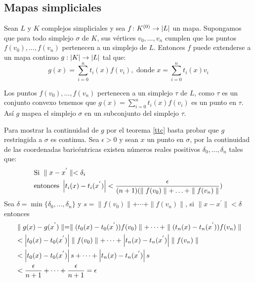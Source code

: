 \subsection{Mapas simpliciales}
\begin{Teo} \label{tms}
Sean $L$ y $K$ complejos simpliciales y sea $f\colon K^{(0)} \rightarrow \left| L \right|$ un mapa. Supongamos que  para todo simplejo $\sigma$ de $K$, sus vértices $v_0,\ldots,v_n$ cumplen que los puntos $f(v_0),\ldots,f(v_n)$ pertenecen a un simplejo de $L$.
Entonces $f$ puede extenderse a un mapa continuo $g:\left| K \right|  \rightarrow \left| L \right|$ tal que:
\begin{equation*}
g(x)= \sum_{i=0}^{n}t_i(x)f(v_i), \textrm{ donde }  x= \sum_{i=0}^{n}t_i(x)v_i
\end{equation*}
\end{Teo}
\begin{Dem}

Los puntos $f(v_0),\ldots,f(v_n)$ pertenecen a un simplejo $\tau$ de $L$, como $\tau$ es un conjunto convexo tenemos que $g(x)= \sum_{i=0}^{n}t_i(x)f(v_i)$ es un punto en $\tau$. Así $g$ mapea el simplejo $\sigma$ en un subconjunto del simplejo $\tau$.

Para mostrar la continuidad de $g$ por el teorema \ref{ttc} basta probar que $g$ restringida a $\sigma$ es continua. Sea $\epsilon > 0$ y sean $x$ un punto en $\sigma$, por la continuidad de las coordenadas baricéntricas existen números reales positivos $\delta_{0},\ldots,\delta_{n}$ tales que:
\begin{align*}
&\text{Si }\parallel x-x^{'} \parallel < \delta_{i}\\
&\text{entonces } \left| t_i(x)-t_i(x^{'}) \right|< \frac{\epsilon}{(n+1)(\parallel f(v_0)\parallel + \ldots+\parallel f(v_n)\parallel})
\end{align*}
Sea $\delta = \min\{\delta_0,\ldots,\delta_n\}$ y $s = \parallel f(v_0)\parallel + \cdots+\parallel f(v_n)\parallel$, si $\parallel x-x^{'}\parallel< \delta$ entonces
\begin{align*}
&\parallel g(x)-g(x^{'})\parallel = \parallel(t_0(x)-t_0(x^{'}))f(v_0)\parallel+\cdots+\parallel(t_n(x)-t_n(x^{'}))f(v_n)\parallel\\
&< \left| t_0(x)-t_0(x^{'}) \right|\parallel f(v_0)\parallel+\cdots +  \left| t_n(x)-t_n(x^{'}) \right|\parallel f(v_n)\parallel \\
&< \left| t_0(x)-t_0(x^{'}) \right|s+\cdots +  \left| t_n(x)-t_n(x^{'}) \right|s\\
&< \frac{\epsilon}{n+1}+\cdots + \frac{\epsilon}{n+1} = \epsilon
\end{align*}
\end{Dem}
